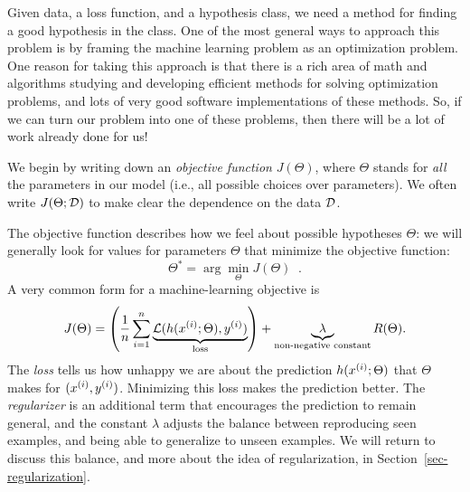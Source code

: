 \label{sec-reg_optim}

Given data, a loss function, and a hypothesis class, we
need a method for finding a good hypothesis in the class.  One of the
most general ways to approach this problem is by framing the machine
learning problem as an optimization problem.  One reason for taking
this approach is that there is a rich area of math and algorithms
studying and developing efficient methods for solving optimization
problems, and lots of very good software implementations of these
methods.  So, if we can turn our problem into one of these problems,
then there will be a lot of work already done for us!

We begin by writing down an \emph{objective function} $J(\Theta)$,
where $\Theta$ stands for {\em all} the parameters in our model (i.e., all possible choices over parameters).
We often write $J(\Theta; {\cal D})$ to make clear the dependence on
the data ${\cal D}$.

The objective function describes how we feel about
possible hypotheses $\Theta$: we will generally look for values for
parameters $\Theta$ that minimize the objective function:%
\[ \Theta^* = \arg\min_{\Theta} J(\Theta)\;\;. \]
A very common form for a machine-learning objective is
%
\begin{equation}
  J(\Theta) = \left(\frac{1}{n} \sum_{i=1}^n
  \underbrace{\mathcal{L}(h(x^{(i)}; \Theta),
    y^{(i)})}_\text{loss}\right) + \underbrace{\lambda}
  _\text{non-negative constant} {R(\Theta)}.
  \label{eq:ml_objective_loss}
\end{equation}
%
The \emph{loss} tells us how unhappy we are about the prediction
$h(x^{(i)}; \Theta)$ that $\Theta$ makes for $(x^{(i)},
  y^{(i)})$.  Minimizing this loss makes the prediction better.  The
\emph{regularizer} is an additional term that encourages the
prediction to remain general, and the constant $\lambda$ adjusts the
balance between reproducing seen examples, and being able to
generalize to unseen examples.  We will return to discuss this
balance, and more about the idea of regularization, in
Section~\ref{sec-regularization}.

